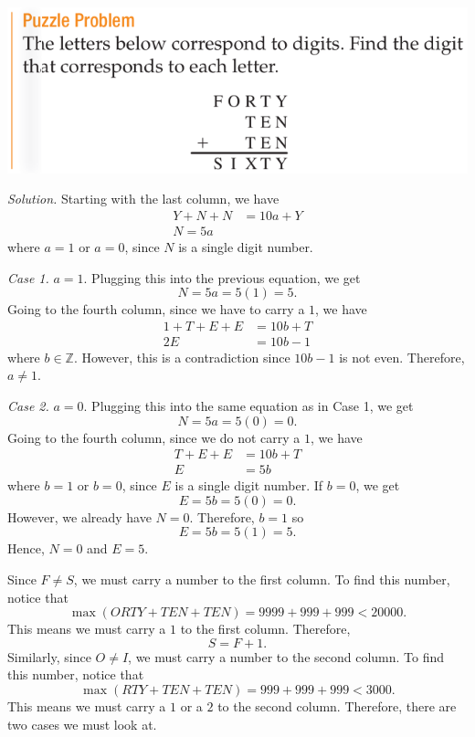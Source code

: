 \documentclass[12pt]{article}
\begin{document}
\begin{center}
\includegraphics[scale=0.6]{forty.png}
\end{center}

\noindent\textit{Solution.}
Starting with the last column, we have
\begin{align*}
    Y+N+N&=10a+Y\\
    N=5a
\end{align*}
where $a=1$ or $a=0$, since $N$ is a single digit number.
\vspace{20px}

\noindent\textit{Case 1.} $a=1$. Plugging this into the previous equation, we get
\[N=5a=5(1)=5.\]
Going to the fourth column, since we have to carry a $1$, we have
\begin{align*}
    1+T+E+E&=10b+T\\
    2E&=10b-1
\end{align*}
where $b\in\mathbb{Z}$. However, this is a contradiction since $10b-1$ is not even. Therefore, $a\neq 1$.
\vspace{20px}

\noindent\textit{Case 2.} $a=0$. Plugging this into the same equation as in Case 1, we get
\[N=5a=5(0)=0.\]
Going to the fourth column, since we do not carry a $1$, we have
\begin{align*}
    T+E+E&=10b+T\\
    E&=5b
\end{align*}
where $b=1$ or $b=0$, since $E$ is a single digit number. If $b=0$, we get
\[E=5b=5(0)=0.\]
However, we already have $N=0$. Therefore, $b=1$ so
\[E=5b=5(1)=5.\]
Hence, $\boxed{N=0}$ and $\boxed{E=5}$.
\newpage

\noindent Since $F\neq S$, we must carry a number to the first column. To find this number, notice that
\[\max(ORTY+TEN+TEN)=9999+999+999<20000.\]
This means we must carry a $1$ to the first column. Therefore,
\[S=F+1.\]
Similarly, since $O\neq I$, we must carry a number to the second column. To find this number, notice that
\[\max(RTY+TEN+TEN)=999+999+999<3000.\]
This means we must carry a $1$ or a $2$ to the second column. Therefore, there are two cases we must look at.
\vspace{20px}
\end{document}
